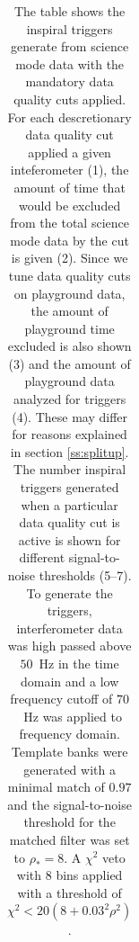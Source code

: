 \begin{table}[p]
\begin{center}
\begin{tabular}{lcccccccc}
\end{tabular}
\end{center}
\caption{\label{t:s2dqresults}%
The table shows the inspiral triggers generate from science mode data with the
mandatory data quality cuts applied. For each descretionary data quality cut
applied a given inteferometer (1), the amount of time that would be excluded
from the total science mode data by the cut is given (2). Since we tune data
quality cuts on playground data, the amount of playground time excluded is
also shown (3) and the amount of playground data analyzed for triggers (4).
These may differ for reasons explained in section \ref{ss:splitup}. The number
inspiral triggers generated when a particular data quality cut is active is
shown for different signal-to-noise thresholds (5--7). To generate the
triggers, interferometer data was high passed above $50$~Hz in the time domain
and a low frequency cutoff of $70$~Hz was applied to frequency domain.
Template banks were generated with a minimal match of $0.97$ and the
signal-to-noise threshold for the matched filter was set to $\rho_\ast = 8$. A
$\chi^2$ veto with $8$ bins applied with a threshold of $\chi^2 < 20 (8 +
0.03^2 \rho^2)$. 
}
\end{table}


